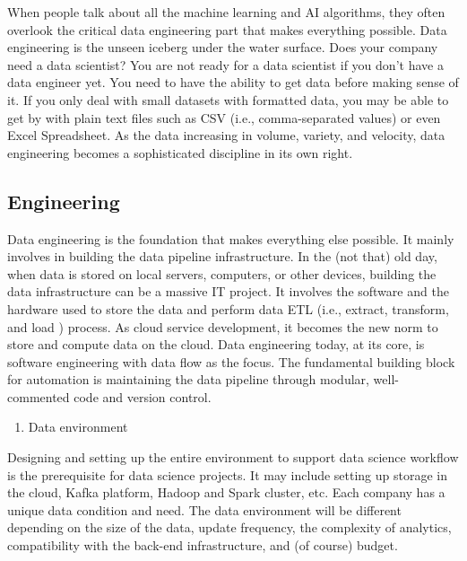 \documentclass[12pt,]{krantz}
\providecommand{\tightlist}{%
  \setlength{\itemsep}{0pt}\setlength{\parskip}{0pt}}
\begin{document}
When people talk about all the machine learning and AI algorithms, they often overlook the critical data engineering part that makes everything possible. Data engineering is the unseen iceberg under the water surface. Does your company need a data scientist? You are not ready for a data scientist if you don't have a data engineer yet. You need to have the ability to get data before making sense of it. If you only deal with small datasets with formatted data, you may be able to get by with plain text files such as CSV (i.e., comma-separated values) or even Excel Spreadsheet. As the data increasing in volume, variety, and velocity, data engineering becomes a sophisticated discipline in its own right.

\hypertarget{engineering}{%
\subsection{Engineering}\label{engineering}}

Data engineering is the foundation that makes everything else possible. It mainly involves in building the data pipeline infrastructure. In the (not that) old day, when data is stored on local servers, computers, or other devices, building the data infrastructure can be a massive IT project. It involves the software and the hardware used to store the data and perform data ETL  (i.e., extract, transform, and load ) process. As cloud service development, it becomes the new norm to store and compute data on the cloud. Data engineering today, at its core, is software engineering with data flow as the focus. The fundamental building block for automation is maintaining the data pipeline through modular, well-commented code and version control.

\begin{enumerate}
\def\labelenumi{(\arabic{enumi})}
\tightlist
\item
  Data environment
\end{enumerate}

Designing and setting up the entire environment to support data science workflow is the prerequisite for data science projects. It may include setting up storage in the cloud, Kafka  platform, Hadoop  and Spark  cluster, etc. Each company has a unique data condition and need. The data environment will be different depending on the size of the data, update frequency, the complexity of analytics, compatibility with the back-end infrastructure, and (of course) budget.
\end{document}
